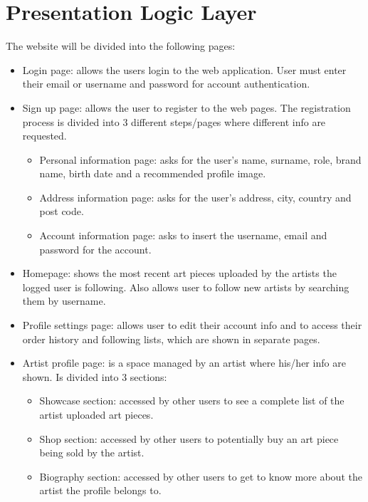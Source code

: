 \section{Presentation Logic Layer}


The website will be divided into the following pages:
\begin{itemize}
    \item Login page: allows the users login to the web application. 
    User must enter their email or username and password for account authentication.
    \item Sign up page: allows the user to register to the web pages. 
    The registration process is divided into 3 different steps/pages where different
    info are requested.
    \begin{itemize}
        \item Personal information page: asks for the user's name, surname, role, brand name, birth date and a recommended profile image.
        \item Address information page: asks for the user's address, city, country and post code.
        \item Account information page: asks to insert the username, email and password for the account.
    \end{itemize}
    \item Homepage: shows the most recent art pieces uploaded by the artists the logged user is following. 
    Also allows user to follow new artists by searching them by username.
    \item Profile settings page: allows user to edit their account info and to access their order history and following lists, which are shown in separate pages.
    \item Artist profile page: is a space managed by an artist where his/her info are shown. 
    Is divided into 3 sections:
    \begin{itemize}
        \item Showcase section: accessed by other users to see a complete list of the artist uploaded art pieces.
        \item Shop section: accessed by other users to potentially buy an art piece being sold by the artist.
        \item Biography section: accessed by other users to get to know more about the artist the profile belongs to.
    \end{itemize}

\end{itemize}
